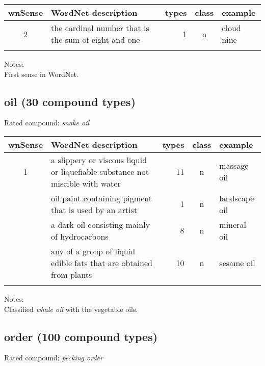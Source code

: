 \noindent
\begin{longtable}{c>{\raggedright\arraybackslash}p{5cm}rc>{\raggedright\arraybackslash}p{2cm}}\lsptoprule
{\small wnSense}&WordNet description&types&class&example\\\midrule
2&the cardinal number that is the sum of eight and one&1&n&cloud nine\\\lspbottomrule
\end{longtable}
\vspace*{-.2cm}

\noindent
Notes:\\
First sense in WordNet.

\subsection{oil       (30 compound types)}
Rated compound: \emph{snake oil}


\noindent
\begin{longtable}{c>{\raggedright\arraybackslash}p{5cm}rc>{\raggedright\arraybackslash}p{2cm}}\lsptoprule
{\small wnSense}&WordNet description&types&class&example\\\midrule
1&a slippery or viscous liquid or liquefiable substance not miscible with water&11&n&massage oil\\\tablevspace
2&oil paint containing pigment that is used by an artist&1&n&landscape oil\\\tablevspace
3&a dark oil consisting mainly of hydrocarbons&8&n&mineral oil\\\tablevspace
4&any of a group of liquid edible fats that are obtained from plants&10&n&sesame oil\\\lspbottomrule
\end{longtable}

\noindent
Notes:\\
Classified \emph{whale oil} with the vegetable oils.

\subsection{order     (100 compound types)}
Rated compound: \emph{pecking order}

\vspace*{1ex}

